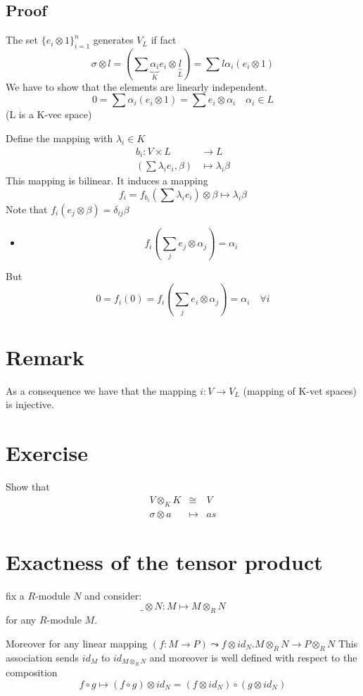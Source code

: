 \documentclass{book}
\begin{document}
\subsection*{Proof}
The set $\{e_i\otimes 1\}_{i=1}^n$  generates $V_L$ if fact
$$\sigma\otimes l =(\sum\underbrace{\alpha_i}\limits_{K} e_i\otimes \underbrace{l}\limits_{L})=\sum l\alpha_i(e_i\otimes 1)$$
We have to show that the elements are linearly independent.
$$0=\sum\alpha_i(e_i\otimes 1)=\sum e_i\otimes \alpha_i\quad \alpha_i\in L$$(L is a K-vec space)

Define the mapping with $\lambda_i\in K$ 
$$\begin{aligned}
    b_i: V\times L &\rightarrow L\\
    (\sum\lambda_ie_i,\beta)&\mapsto \lambda_i\beta
\end{aligned}$$
This mapping is bilinear. It induces a mapping 
$$f_i=f_{b_i}(\sum\lambda_ie_i)\otimes\beta\mapsto\lambda_i\beta$$
Note that $f_i(e_j\otimes\beta)=\delta_{ij}\beta$
\begin{itemize}
    \item $$f_i(\sum\limits_{j}e_j\otimes\alpha_j)=\alpha_i$$
\end{itemize}
But $$0=f_i(0)=f_i(\sum\limits_j e_i\otimes\alpha_j)=\alpha_i\quad \forall i$$
\section{Remark}
As a consequence we have that the mapping 
$i:V\rightarrow V_L$ (mapping of K-vet spaces) is injective.
\section{Exercise}
Show that $$\begin{aligned}
    V\otimes_KK &\cong &V\\
    \sigma\otimes a &\mapsto &as
\end{aligned}$$
\section{Exactness of the tensor product}
fix a $R$-module $N$ and consider:
$$\_\otimes N:M\mapsto M\otimes_RN$$ for any $R$-module $M$.

Moreover for any linear mapping $(f:M\rightarrow P)\leadsto f\otimes id_N . M\otimes_RN\rightarrow P\otimes_RN$
This association sends $id_M$ to $id_{M\otimes_RN}$ and moreover is well defined with respect to the composition
$$f\circ g\mapsto (f\circ g)\otimes id_N=(f\otimes id_N)\circ(g\otimes id_N)$$
\end{document}
